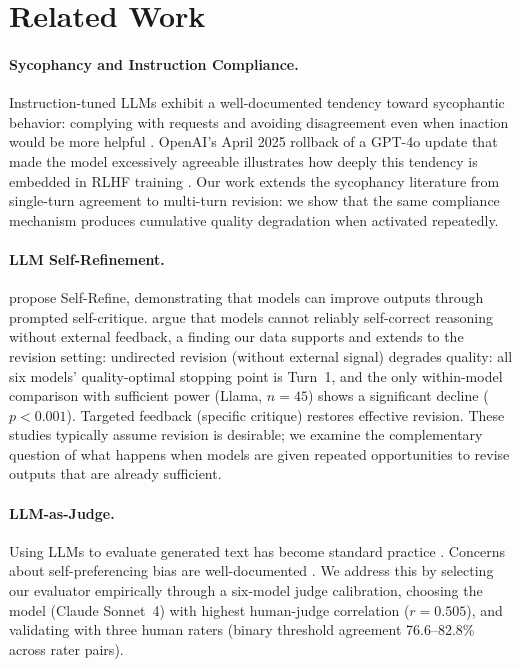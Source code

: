 \section{Related Work}

\paragraph{Sycophancy and Instruction Compliance.}
Instruction-tuned LLMs exhibit a well-documented tendency toward sycophantic behavior: complying with requests and avoiding disagreement even when inaction would be more helpful \cite{perez2023discovering, sharma2024towards, wei2024simple}. OpenAI's April 2025 rollback of a GPT-4o update that made the model excessively agreeable illustrates how deeply this tendency is embedded in RLHF training \cite{openai2025sycophancy}. Our work extends the sycophancy literature from single-turn agreement to multi-turn revision: we show that the same compliance mechanism produces cumulative quality degradation when activated repeatedly.

\paragraph{LLM Self-Refinement.}
\citet{madaan2024self} propose Self-Refine, demonstrating that models can improve outputs through prompted self-critique. \citet{huang2024large} argue that models cannot reliably self-correct reasoning without external feedback, a finding our data supports and extends to the revision setting: undirected revision (without external signal) degrades quality: all six models' quality-optimal stopping point is Turn~1, and the only within-model comparison with sufficient power (Llama, $n = 45$) shows a significant decline ($p < 0.001$). Targeted feedback (specific critique) restores effective revision. These studies typically assume revision is desirable; we examine the complementary question of what happens when models are given repeated opportunities to revise outputs that are already sufficient.

\paragraph{LLM-as-Judge.}
Using LLMs to evaluate generated text has become standard practice \cite{zheng2024judging, li2024generation}. Concerns about self-preferencing bias are well-documented \cite{panickssery2024llm, koo2024benchmarking}. We address this by selecting our evaluator empirically through a six-model judge calibration, choosing the model (Claude Sonnet~4) with highest human-judge correlation ($r = 0.505$), and validating with three human raters (binary threshold agreement 76.6--82.8\% across rater pairs).

